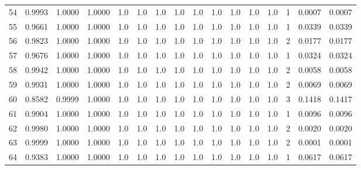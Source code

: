 \begin{tabular}{lrrrrrrrrrrrrrrr}
54  &      0.9993 &  1.0000 &  1.0000 &     1.0 &     1.0 &     1.0 &     1.0 &     1.0 &     1.0 &     1.0 &      1.0 &        1.0 &      1 &                    0.0007 &                     0.0007 \\
55  &      0.9661 &  1.0000 &  1.0000 &     1.0 &     1.0 &     1.0 &     1.0 &     1.0 &     1.0 &     1.0 &      1.0 &        1.0 &      1 &                    0.0339 &                     0.0339 \\
56  &      0.9823 &  1.0000 &  1.0000 &     1.0 &     1.0 &     1.0 &     1.0 &     1.0 &     1.0 &     1.0 &      1.0 &        1.0 &      2 &                    0.0177 &                     0.0177 \\
57  &      0.9676 &  1.0000 &  1.0000 &     1.0 &     1.0 &     1.0 &     1.0 &     1.0 &     1.0 &     1.0 &      1.0 &        1.0 &      1 &                    0.0324 &                     0.0324 \\
58  &      0.9942 &  1.0000 &  1.0000 &     1.0 &     1.0 &     1.0 &     1.0 &     1.0 &     1.0 &     1.0 &      1.0 &        1.0 &      2 &                    0.0058 &                     0.0058 \\
59  &      0.9931 &  1.0000 &  1.0000 &     1.0 &     1.0 &     1.0 &     1.0 &     1.0 &     1.0 &     1.0 &      1.0 &        1.0 &      2 &                    0.0069 &                     0.0069 \\
60  &      0.8582 &  0.9999 &  1.0000 &     1.0 &     1.0 &     1.0 &     1.0 &     1.0 &     1.0 &     1.0 &      1.0 &        1.0 &      3 &                    0.1418 &                     0.1417 \\
61  &      0.9904 &  1.0000 &  1.0000 &     1.0 &     1.0 &     1.0 &     1.0 &     1.0 &     1.0 &     1.0 &      1.0 &        1.0 &      1 &                    0.0096 &                     0.0096 \\
62  &      0.9980 &  1.0000 &  1.0000 &     1.0 &     1.0 &     1.0 &     1.0 &     1.0 &     1.0 &     1.0 &      1.0 &        1.0 &      2 &                    0.0020 &                     0.0020 \\
63  &      0.9999 &  1.0000 &  1.0000 &     1.0 &     1.0 &     1.0 &     1.0 &     1.0 &     1.0 &     1.0 &      1.0 &        1.0 &      2 &                    0.0001 &                     0.0001 \\
64  &      0.9383 &  1.0000 &  1.0000 &     1.0 &     1.0 &     1.0 &     1.0 &     1.0 &     1.0 &     1.0 &      1.0 &        1.0 &      1 &                    0.0617 &                     0.0617 \\

\end{tabular}
